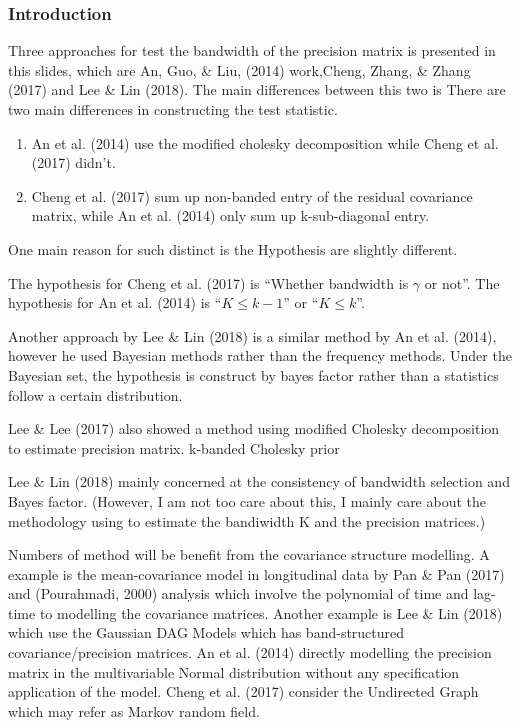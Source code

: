 \documentclass{beamer}
\begin{document}
\begin{frame}
\frametitle{Introduction}
Three approaches for test the bandwidth of the precision matrix is presented in this slides, which are An, Guo, \& Liu, (2014) work,Cheng, Zhang, \& Zhang (2017) and  Lee \& Lin (2018).
The main differences between this two is 
There are two main differences in constructing the test statistic.

\begin{enumerate}
\item An et al. (2014) use the modified cholesky decomposition
	while Cheng et al. (2017) didn't.
	
\item Cheng et al. (2017) sum up non-banded entry of the residual covariance matrix, while An et al. (2014) only sum up k-sub-diagonal entry.
\end{enumerate}

One main reason for such distinct is the Hypothesis are slightly different.

The hypothesis for Cheng et al. (2017) is ``Whether bandwidth is
\(\gamma\) or not''. The hypothesis for An et al. (2014) is
``\(K\leqslant k-1\)'' or ``\(K\leqslant k\)''.


\end{frame}


\begin{frame}
Another approach by Lee \& Lin (2018) is a similar method by An et al.
(2014), however he used Bayesian methods rather than the frequency
methods. Under the Bayesian set, the hypothesis is construct by bayes
factor rather than a statistics follow a certain distribution.

Lee \& Lee (2017) also showed a method using modified Cholesky
decomposition to estimate precision matrix. k-banded Cholesky prior

Lee \& Lin (2018) mainly concerned at the consistency of bandwidth
selection and Bayes factor. (However, I am not too care about this, I
mainly care about the methodology using to estimate the bandiwidth K and
the precision matrices.)

\end{frame}

\begin{frame}

Numbers of method will be benefit from the covariance structure modelling.
A example is the mean-covariance model
in longitudinal data by Pan \& Pan (2017) and (Pourahmadi, 2000)
analysis which involve the polynomial of time and lag-time to modelling
the covariance matrices. Another example is Lee \& Lin (2018) which use
the Gaussian DAG Models which has band-structured covariance/precision
matrices.
An et al. (2014) directly modelling the precision matrix in the multivariable Normal distribution without any specification application of the model.
Cheng et al. (2017)  consider the Undirected Graph which may refer as Markov random field.

\end{frame}
\end{document}
